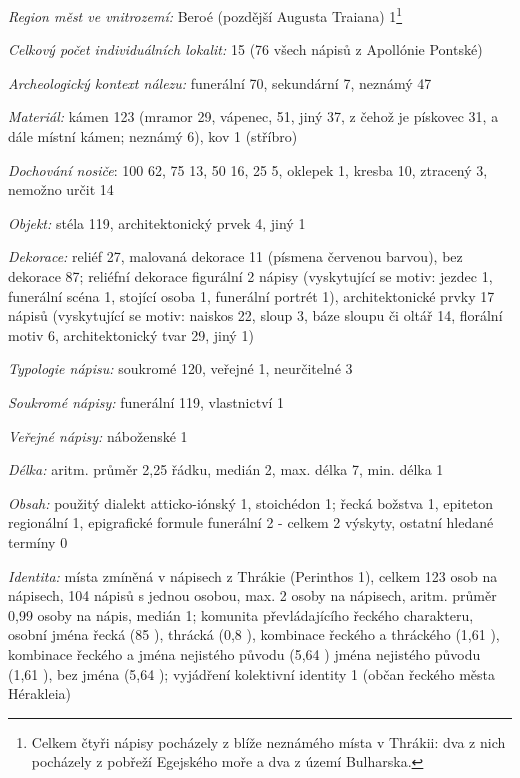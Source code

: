 {\em Region měst ve vnitrozemí:} Beroé (pozdější Augusta Traiana) 1\footnote{Celkem čtyři nápisy pocházely z blíže neznámého místa v Thrákii: dva z nich pocházely z pobřeží Egejského moře a dva z území Bulharska.}

{\em Celkový počet individuálních lokalit:} 15 (76  všech nápisů z Apollónie Pontské)

{\em Archeologický kontext nálezu:} funerální 70, sekundární 7, neznámý 47

{\em Materiál:} kámen 123 (mramor 29, vápenec, 51, jiný 37, z čehož je pískovec 31, a dále místní kámen; neznámý 6), kov 1 (stříbro)

{\em Dochování nosiče}: 100  62, 75  13, 50  16, 25  5, oklepek 1, kresba 10, ztracený 3, nemožno určit 14

{\em Objekt:} stéla 119, architektonický prvek 4, jiný 1

{\em Dekorace:} reliéf 27, malovaná dekorace 11 (písmena červenou barvou), bez dekorace 87; reliéfní dekorace figurální 2 nápisy (vyskytující se motiv: jezdec 1, funerální scéna 1, stojící osoba 1, funerální portrét 1), architektonické prvky 17 nápisů (vyskytující se motiv: naiskos 22, sloup 3, báze sloupu či oltář 14, florální motiv 6, architektonický tvar 29, jiný 1)

{\em Typologie nápisu:} soukromé 120, veřejné 1, neurčitelné 3

{\em Soukromé nápisy:} funerální 119, vlastnictví 1

{\em Veřejné nápisy:} náboženské 1

{\em Délka:} aritm. průměr 2,25 řádku, medián 2, max. délka 7, min. délka 1

{\em Obsah:} použitý dialekt atticko-iónský 1, stoichédon 1; řecká božstva 1, epiteton regionální 1, epigrafické formule funerální 2 - celkem 2 výskyty, ostatní hledané termíny 0

{\em Identita:} místa zmíněná v nápisech z Thrákie (Perinthos 1), celkem 123 osob na nápisech, 104 nápisů s jednou osobou, max. 2 osoby na nápisech, aritm. průměr 0,99 osoby na nápis, medián 1; komunita převládajícího řeckého charakteru, osobní jména řecká (85 ), thrácká (0,8 ), kombinace řeckého a thráckého (1,61 ), kombinace řeckého a jména nejistého původu (5,64 ) jména nejistého původu (1,61 ), bez jména (5,64 ); vyjádření kolektivní identity 1 (občan řeckého města Hérakleia)

